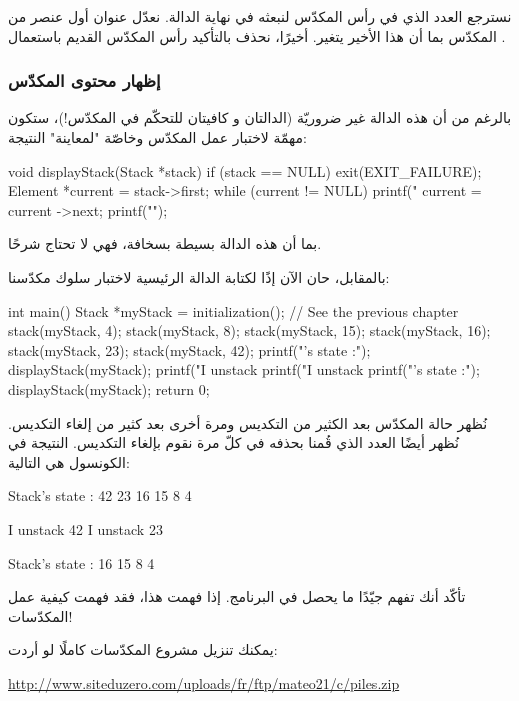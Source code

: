 نسترجع العدد الذي في رأس المكدّس لنبعثه في نهاية الدالة. نعدّل عنوان أول عنصر من المكدّس بما أن هذا الأخير يتغير.
أخيرًا، نحذف بالتأكيد رأس المكدّس القديم باستعمال
.

\subsubsection{إظهار محتوى المكدّس}

بالرغم من أن هذه الدالة غير ضروريّة (الدالتان
و 
كافيتان للتحكّم في المكدّس!)، ستكون مهمّة لاختبار عمل المكدّس وخاصّة "لمعاينة" النتيجة:

\begin{Csource}
void displayStack(Stack *stack)
{
	if (stack == NULL)
	{
		exit(EXIT_FAILURE);
	}
	Element *current = stack->first;
	while (current != NULL)
	{
		printf("%
		current = current ->next;
	}
	printf("\n");
}
\end{Csource}

بما أن هذه الدالة بسيطة بسخافة، فهي لا تحتاج شرحًا.

بالمقابل، حان الآن إذًا لكتابة الدالة الرئيسية لاختبار سلوك مكدّسنا:

\begin{Csource}
int main()
{
	Stack *myStack = initialization(); // See the previous chapter
	stack(myStack, 4);
	stack(myStack, 8);
	stack(myStack, 15);
	stack(myStack, 16);
	stack(myStack, 23);
	stack(myStack, 42);
	printf("\nStack's state :\n");
	displayStack(myStack);
	printf("I unstack %
	printf("I unstack %
	printf("\nStack's state :\n");
	displayStack(myStack);
	return 0;
}
\end{Csource}

نُظهر حالة المكدّس بعد الكثير من التكديس ومرة أخرى بعد كثير من إلغاء التكديس. نُظهر أيضًا العدد الذي قُمنا بحذفه في كلّ مرة نقوم بإلغاء التكديس. النتيجة في الكونسول هي التالية:

\begin{Console}
Stack's state :
42
23
16
15
8
4

I unstack 42
I unstack 23

Stack's state :
16
15
8
4
\end{Console}

تأكّد أنك تفهم جيّدًا ما يحصل في البرنامج. إذا فهمت هذا، فقد فهمت كيفية عمل المكدّسات!

يمكنك تنزيل مشروع المكدّسات كاملًا لو أردت:

\url{http://www.siteduzero.com/uploads/fr/ftp/mateo21/c/piles.zip}

